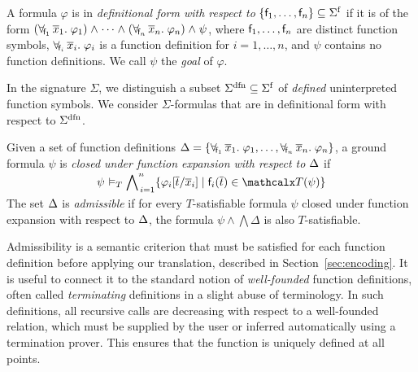 \begin{definition}\rm
A formula $\varphi$ is in \emph{definitional form with respect to}
$\{ \con{f}_1, \dotsc, \con{f}_n \} \subseteq \sfuns{\Sigma}$ if it is of the
form
%
%
$(\forallf{\con{f}_1} \vec x_1.\; \varphi_1) \wedge \cdots \wedge
(\forallf{\con{f}_n} \vec x_n.\; \varphi_n) \wedge \psi$,
%
where $\mathsf{f}_1, \dotsc, \mathsf{f}_n$ are distinct function symbols,
$\forall_{\!\mathsf{f}_i\:} \overline{x}_i.\; \varphi_i$ is a function definition
for $i = 1, \dotsc, n$,
%
and $\psi$ contains no function definitions.
We call $\psi$ the \emph{goal} of $\varphi$.
\end{definition}

In the signature $\Sigma$, we distinguish a subset $\sfundefs{\Sigma}
\subseteq \sfuns{\Sigma}$ of \emph{defined} uninterpreted function symbols.
We consider $\Sigma$-formulas that are in definitional form with respect to
$\sfundefs{\Sigma}$.

\begin{definition}\rm
Given a set of function definitions
$\DDD = \{ \forallf{\con{f}_1} \vec x_1.\; \varphi_1, \dotsc, \forallf{\con{f}_n} \vec x_n.\; \varphi_n \}$,
a ground formula $\psi$
is \emph{closed under function expansion with respect to $\DDD$} if
\[\psi \models_T \smash{\bigwedge\nolimits_{\,i=1}^{n} \{ \varphi_i[ \vec t / \vec x_i ] \mid \con{f}_i( \vec t ) \in \terms( \psi ) \}}\]
The set $\DDD$ is \emph{admissible} if for every $T$-satisfiable formula
$\psi$ closed under function expansion with respect to $\DDD$,
the formula
$\psi \wedge \bigwedge \Delta$ is also $T$-satisfiable.
\end{definition}

Admissibility is a semantic criterion that must be satisfied for each function
definition before applying our translation, described in
Section~\ref{sec:encoding}. It is useful to connect it to the
standard notion of \emph{well-founded} function definitions, often called
\emph{terminating} definitions in a slight abuse of terminology. In such
definitions, all recursive calls are decreasing with respect to a well-founded
relation, which must be supplied by the user or inferred automatically
using a termination prover. This ensures that the function is uniquely defined
at all points.

